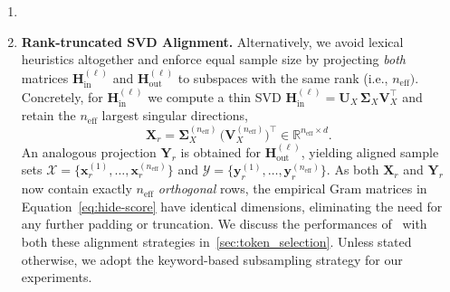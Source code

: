 \begin{enumerate}[leftmargin=1.2em,label=(\roman*)]
\item{}

\item\textbf{Rank-truncated SVD Alignment.}\;
  Alternatively, we avoid lexical heuristics altogether and enforce equal
  sample size by projecting \emph{both} matrices $\mathbf H^{(\ell)}_{\text{in}}$ and $\mathbf H^{(\ell)}_{\text{out}}$ to subspaces with the same rank (i.e., $n_{\text{eff}})$.
  Concretely, for $\mathbf H^{(\ell)}_{\text{in}}$ we compute a thin SVD
  $\mathbf H^{(\ell)}_{\text{in}}
     =\mathbf U_{X}\,\boldsymbol\Sigma_{X}\mathbf V_{X}^{\top}$ and retain the
  $n_{\text{eff}}$ largest singular directions,
  \begin{equation}
     \mathbf X_{r}
        =\boldsymbol\Sigma_{X}^{(n_{\text{eff}})}\,
         \bigl(\mathbf V_{X}^{(n_{\text{eff}})}\bigr)^{\!\top}\in\mathbb R^{n_{\text{eff}}\times d}.
  \end{equation}
  An analogous projection $\mathbf Y_{r}$ is obtained for
  $\mathbf H^{(\ell)}_{\text{out}}$, yielding aligned sample sets
  $\mathcal X=\{\mathbf x_{r}^{(1)},\dots,\mathbf x_{r}^{(n_{\text{eff}})}\}$ and
  $\mathcal Y=\{\mathbf y_{r}^{(1)},\dots,\mathbf y_{r}^{(n_{\text{eff}})}\}$.
  As both $\mathbf X_{r}$ and $\mathbf Y_{r}$ now contain exactly $n_{\text{eff}}$
  \emph{orthogonal} rows, the empirical Gram matrices in Equation~\eqref{eq:hide-score} have identical dimensions, eliminating the need for any further padding or truncation. We discuss the performances of \method~with both these alignment strategies in~\cref{sec:token_selection}. Unless stated otherwise, we adopt the keyword-based subsampling strategy for our experiments.
\end{enumerate}

